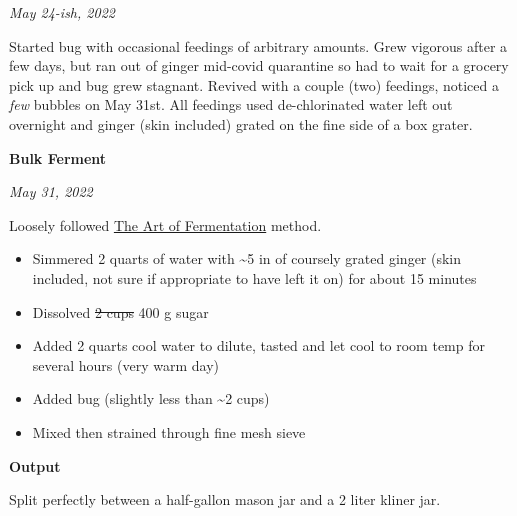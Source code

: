 \documentclass[
]{book}
\begin{document}
\emph{May 24-ish, 2022}

Started bug with occasional feedings of arbitrary amounts. Grew vigorous after a few days, but ran out of ginger mid-covid quarantine so had to wait for a grocery pick up and bug grew stagnant. Revived with a couple (two) feedings, noticed a \emph{few} bubbles on May 31st. All feedings used de-chlorinated water left out overnight and ginger (skin included) grated on the fine side of a box grater.

\textbf{Bulk Ferment}

\emph{May 31, 2022}

Loosely followed \href{https://www.wildfermentation.com/the-art-of-fermentation/}{The Art of Fermentation} method.

\begin{itemize}
\item
  Simmered 2 quarts of water with \textasciitilde5 in of coursely grated ginger (skin included, not sure if appropriate to have left it on) for about 15 minutes
\item
  Dissolved \sout{2 cups} 400 g sugar
\item
  Added 2 quarts cool water to dilute, tasted and let cool to room temp for several hours (very warm day)
\item
  Added bug (slightly less than \textasciitilde2 cups)
\item
  Mixed then strained through fine mesh sieve
\end{itemize}

\textbf{Output}

Split perfectly between a half-gallon mason jar and a 2 liter kliner jar.
\end{document}
